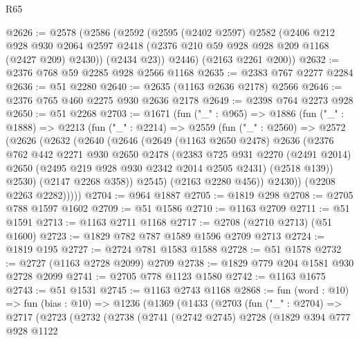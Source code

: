 \begin{lexlean}{R65}
\begin{coremodule}
@2626 := @2578
    (@2586
      (@2592
        (@2595
          (@2402 @2597)
          @2582
          (@2406
            @212
            @928
            @930
            @2064
            @2597
            @2418
            (@2376 @210 @59 @928 @928 @209 @1168 (@2427 @209) @2430))
          (@2434 @23))
        @2446)
      (@2163 @2261 @200))
@2632 := @2376 @768 @59 @2285 @928 @2566 @1168
@2635 := @2383 @767 @2277 @2284
@2636 := @51 @2280
@2640 := @2635 (@1163 @2636 @2178) @2566
@2646 := @2376 @765 @460 @2275 @930 @2636 @2178
@2649 := @2398 @764 @2273 @928
@2650 := @51 @2268
@2703 := @1671
    (fun ("_" : @965) =>
    @1886
      (fun ("_" : @1888) =>
      @2213
        (fun ("_" : @2214) =>
        @2559
          (fun ("_" : @2560) =>
          @2572
            (@2626
              (@2632
                (@2640
                  (@2646
                    (@2649
                      (@1163 @2650 @2478)
                      @2636
                      (@2376
                        @762
                        @442
                        @2271
                        @930
                        @2650
                        @2478
                        (@2383
                          @725
                          @931
                          @2270
                          (@2491 @2014)
                          @2650
                          (@2495 @219 @928 @930 @2342 @2014 @2505 @2431)
                          (@2518 @139))
                        @2530)
                      (@2147 @2268 @358))
                    @2545)
                  (@2163 @2280 @456))
                @2430))
            (@2208 @2263 @2282)))))
@2704 := @964 @1887
@2705 := @1819 @298
@2708 := @2705 @788 @1597 @1602
@2709 := @51 @1586
@2710 := @1163 @2709
@2711 := @51 @1591
@2713 := @1163 @2711 @1168
@2717 := @2708 (@2710 @2713) (@51 @1600)
@2723 := @1829 @782 @787 @1589 @1596 @2709 @2713
@2724 := @1819 @195
@2727 := @2724 @781 @1583 @1588
@2728 := @51 @1578
@2732 := @2727 (@1163 @2728 @2099) @2709
@2738 := @1829 @779 @204 @1581 @930 @2728 @2099
@2741 := @2705 @778 @1123 @1580
@2742 := @1163 @1675
@2743 := @51 @1531
@2745 := @1163 @2743 @1168
@2868 := fun (word : @10) =>
  fun (bias : @10) =>
  @1236
    (@1369
      (@1433
        (@2703
          (fun ("_" : @2704) =>
          @2717
            (@2723
              (@2732
                (@2738
                  (@2741
                    (@2742 @2745)
                    @2728
                    (@1829
                      @394
                      @777
                      @928
                      @1122

\end{coremodule}
\end{lexlean}
